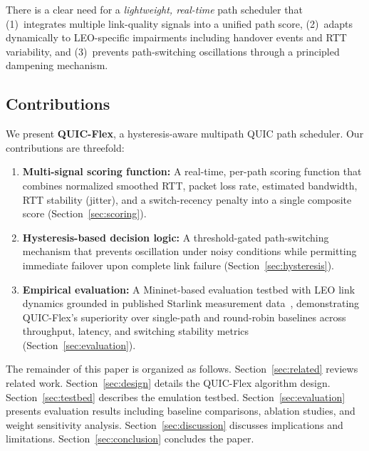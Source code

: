\documentclass[conference,10pt]{IEEEtran}
\begin{document}
There is a clear need for a \emph{lightweight, real-time} path scheduler that (1)~integrates multiple link-quality signals into a unified path score, (2)~adapts dynamically to LEO-specific impairments including handover events and RTT variability, and (3)~prevents path-switching oscillations through a principled dampening mechanism.

\subsection{Contributions}

We present \textbf{QUIC-Flex}, a hysteresis-aware multipath QUIC path scheduler.
Our contributions are threefold:

\begin{enumerate}
    \item \textbf{Multi-signal scoring function:} A real-time, per-path scoring function that combines normalized smoothed RTT, packet loss rate, estimated bandwidth, RTT stability (jitter), and a switch-recency penalty into a single composite score (Section~\ref{sec:scoring}).
    \item \textbf{Hysteresis-based decision logic:} A threshold-gated path-switching mechanism that prevents oscillation under noisy conditions while permitting immediate failover upon complete link failure (Section~\ref{sec:hysteresis}).
    \item \textbf{Empirical evaluation:} A Mininet-based evaluation testbed with LEO link dynamics grounded in published Starlink measurement data~\cite{kassem2025starlink, mohan2026starlinkv2}, demonstrating QUIC-Flex's superiority over single-path and round-robin baselines across throughput, latency, and switching stability metrics (Section~\ref{sec:evaluation}).
\end{enumerate}

The remainder of this paper is organized as follows.
Section~\ref{sec:related} reviews related work.
Section~\ref{sec:design} details the QUIC-Flex algorithm design.
Section~\ref{sec:testbed} describes the emulation testbed.
Section~\ref{sec:evaluation} presents evaluation results including baseline comparisons, ablation studies, and weight sensitivity analysis.
Section~\ref{sec:discussion} discusses implications and limitations.
Section~\ref{sec:conclusion} concludes the paper.

\end{document}
